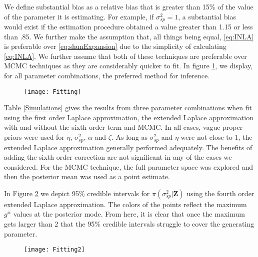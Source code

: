 \documentclass[11pt]{isuthesis}
\begin{document}
	We define substantial bias as a relative bias that is greater than 15\% of the value of the parameter it is estimating.  For example, if $\sigma_{sp}^2=1$, a substantial bias would exist if the estimation procedure obtained a value greater than 1.15 or less than .85.  We further make the assumption that, all things being equal, \eqref{eq:INLA} is preferable over \eqref{eq:shunExpansion} due to the simplicity of calculating \eqref{eq:INLA}.  We further assume that both of these techniques are preferable over MCMC techniques as they are considerably quicker to fit.  In figure \ref{fig:Fitting}, we display, for all parameter combinations, the preferred method for inference.
	
	
	\begin{figure}[!htp]
		\centering
		\texttt{[image: Fitting]}
		\label{fig:Fitting}
	\end{figure}
	
	 Table \ref{Simulations} gives the results from three parameter combinations when fit using the first order Laplace approximation, the extended Laplace approximation with and without the sixth order term and MCMC.   In all cases, vague proper priors were used for $\eta$, $\sigma_{sp}^2$, $\alpha$ and $\zeta$. As long as $\sigma^2_{sp}$ and $\eta$ were not close to 1, the extended Laplace approximation generally performed adequately.  The benefits of adding the sixth order correction are not significant in any of the cases we considered.   For the MCMC technique, the full parameter space was explored and then the posterior mean was used as a point estimate. 
	 
	 In Figure \ref{fig:Fitting2} we depict 95\% credible intervals for $\pi(\sigma^2_{sp}|\boldsymbol{Z})$ using the fourth order extended Laplace approximation.  The colors of the points reflect the maximum $g^{ii}$ values at the posterior mode.  From here, it is clear that once the maximum gets larger than 2 that the 95\% credible intervals struggle to cover the generating parameter.
	 
	 
	  
	 \begin{figure}[!htp]
	 	\centering
	 	\texttt{[image: Fitting2]}
	 	\label{fig:Fitting2}
	 \end{figure}
	
\end{document}
